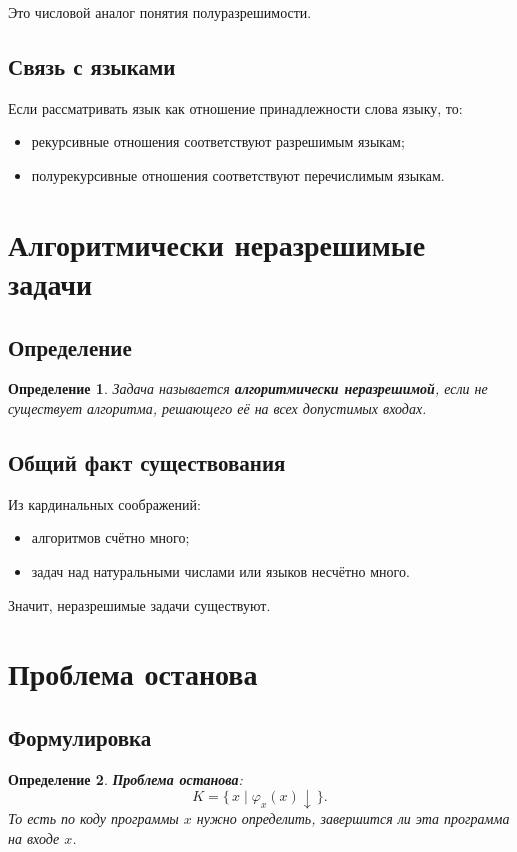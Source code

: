 \documentclass[12pt,a4paper]{article}
\newtheorem{definition}{Определение}
\begin{document}
Это числовой аналог понятия полуразрешимости.

\subsection{Связь с языками}
Если рассматривать язык как отношение принадлежности слова языку, то:
\begin{itemize}
    \item рекурсивные отношения соответствуют разрешимым языкам;
    \item полурекурсивные отношения соответствуют перечислимым языкам.
\end{itemize}

\section{Алгоритмически неразрешимые задачи}

\subsection{Определение}
\begin{definition}
Задача называется \textbf{алгоритмически неразрешимой}, если не существует алгоритма, решающего её на всех допустимых входах.
\end{definition}

\subsection{Общий факт существования}
Из кардинальных соображений:
\begin{itemize}
    \item алгоритмов счётно много;
    \item задач над натуральными числами или языков несчётно много.
\end{itemize}
Значит, неразрешимые задачи существуют.

\section{Проблема останова}

\subsection{Формулировка}
\begin{definition}
\textbf{Проблема останова}:
\[
K=\{\,x \mid \varphi_x(x)\downarrow \,\}.
\]
То есть по коду программы $x$ нужно определить, завершится ли эта программа на входе $x$.
\end{definition}
\end{document}
